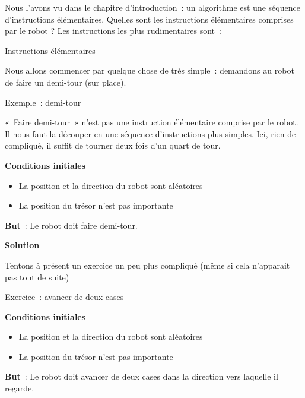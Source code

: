 	Nous l'avons vu dans le chapitre
	d'introduction~: un algorithme est une séquence
	d'instructions élémentaires. Quelles sont les
	instructions élémentaires comprises par le robot ? Les instructions les
	plus rudimentaires sont~:
	
	\begin{Emphase}[definition]{Instructions élémentaires}
	\end{Emphase}
		
	Nous allons commencer par quelque chose de très simple~: demandons au
	robot de faire un demi-tour (sur place).

	\begin{Emphase}[exercice]{Exemple~: demi-tour}

		«~Faire demi-tour~» n'est pas une instruction
		élémentaire comprise par le robot. Il nous faut la découper en une
		séquence d'instructions plus simples. Ici, rien de
		compliqué, il suffit de tourner deux fois d'un quart
		de tour.

		\textbf{Conditions initiales}

		\begin{itemize}
		\item La position et la direction du robot sont aléatoires
		\item La position du trésor n'est pas importante
		\end{itemize}

		\textbf{But}~: Le robot doit faire demi-tour.

		\textbf{Solution}

		
	\end{Emphase}

	Tentons à présent un exercice un peu plus compliqué
	(même si cela n'apparait pas tout de suite)

	
	\begin{Emphase}[exercice]{Exercice~: avancer de deux cases}

		\textbf{Conditions initiales}

		\begin{itemize}
		\item La position et la direction du robot sont aléatoires
		\item La position du trésor n'est pas importante
		\end{itemize}
		
		\textbf{But}~: Le robot doit avancer de deux cases dans la direction
		vers laquelle il regarde.

	\end{Emphase}

